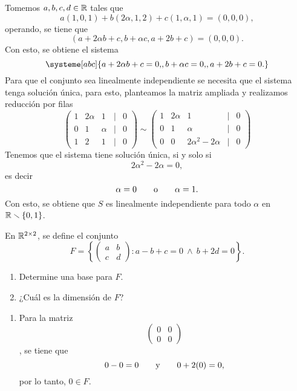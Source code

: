 \documentclass[11pt,a5]{aleph-examen}
\begin{document}
\begin{preguntas}
\begin{respuesta}
    Tomemos $a,b,c,d\in\mathbb{R}$ tales que
    \[
        a(1,0,1) + b(2\alpha,1,2) + c(1,\alpha,1) = (0,0,0),
    \]
    operando, se tiene que
    \[ 
        (a + 2\alpha b + c, b + \alpha c, a + 2b + c) = (0,0,0).
    \]
    Con esto, se obtiene el sistema
    \[
        \systeme[abc]{
            a + 2\alpha b + c = 0{,},
            b + \alpha c = 0{,},
            a + 2b + c = 0{.}
        }
    \]
    Para que el conjunto sea linealmente independiente se necesita que el sistema tenga solución única, para esto, planteamos la matriz ampliada y realizamos reducción por filas
    \[
        \begin{pmatrix}
            1 & 2\alpha & 1 & | & 0\\
            0 & 1 & \alpha & | & 0\\
            1 & 2 & 1 & | & 0
        \end{pmatrix}
        \sim
        \begin{pmatrix}
            1 & 2\alpha & 1 & | & 0\\
            0 & 1 & \alpha & | & 0\\
            0 & 0 & 2\alpha^2 -2\alpha & | & 0
        \end{pmatrix}
    \]
    Tenemos que el sistema tiene solución única, si y solo si 
    \[
        2\alpha^2 - 2\alpha = 0,
    \]
    es decir
    \[
        \alpha = 0 \qquad\text{o}\qquad \alpha = 1.
    \]
    Con esto, se obtiene que $S$ es linealmente independiente para todo $\alpha$ en $\mathbb{R}\smallsetminus\{0,1\}$.
\end{respuesta}


\item
    En $\mathbb{R}^{2\times2}$, se define el conjunto
    \[
        F = \left\{ \begin{pmatrix} a & b\\ c & d \end{pmatrix} : a-b+c=0\ \land\ b+2d=0 \right\}.
    \]
    \begin{enumerate}
    \item
        Determine una base para $F$.
    \item
        ¿Cuál es la dimensión de $F$?
    \end{enumerate}

\begin{respuesta}\hspace{0pt}
    \begin{enumerate}
    \item 
        Para la matriz
        \[
            \begin{pmatrix}
                0 & 0 \\
                0 & 0 
            \end{pmatrix}    
        \],
        se tiene que
        \[
            0 - 0 = 0 \qquad\text{y}\qquad 0+2(0)= 0,
        \]
        por lo tanto, $0\in F$.
        

\end{enumerate}
\end{respuesta}
\end{preguntas}
\end{document}
